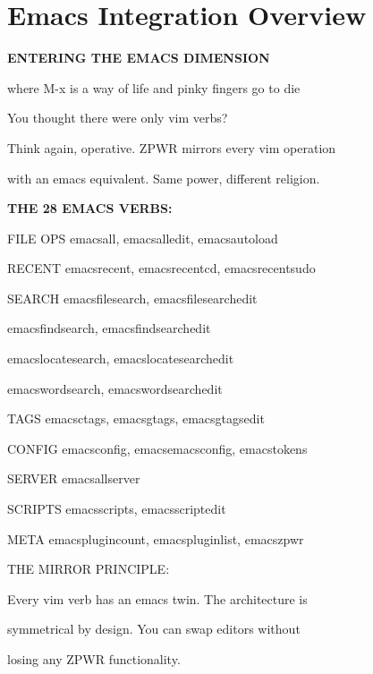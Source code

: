 \documentclass[11pt,a4paper,twoside]{book}
\begin{document}
\section{Emacs Integration Overview}


\vspace{10pt}
{\large\bfseries\color{neoncyan} ENTERING THE EMACS DIMENSION}\vspace{6pt}

where M-x is a way of life and pinky fingers go to die

\begin{codebox}
You thought there were only vim verbs?\\
\end{codebox}

Think again, operative. ZPWR mirrors every vim operation

with an emacs equivalent. Same power, different religion.


\vspace{12pt}
{\bfseries\color{neonyellow} THE 28 EMACS VERBS:}\vspace{4pt}

FILE OPS      emacsall, emacsalledit, emacsautoload

RECENT        emacsrecent, emacsrecentcd, emacsrecentsudo

SEARCH        emacsfilesearch, emacsfilesearchedit

emacsfindsearch, emacsfindsearchedit

emacslocatesearch, emacslocatesearchedit

emacswordsearch, emacswordsearchedit

TAGS          emacsctags, emacsgtags, emacsgtagsedit

CONFIG        emacsconfig, emacsemacsconfig, emacstokens

SERVER        emacsallserver

SCRIPTS       emacsscripts, emacsscriptedit

\begin{codebox}
META          emacsplugincount, emacspluginlist, emacszpwr\\
\end{codebox}

THE MIRROR PRINCIPLE:

Every vim verb has an emacs twin. The architecture is

symmetrical by design. You can swap editors without

losing any ZPWR functionality.
\end{document}
